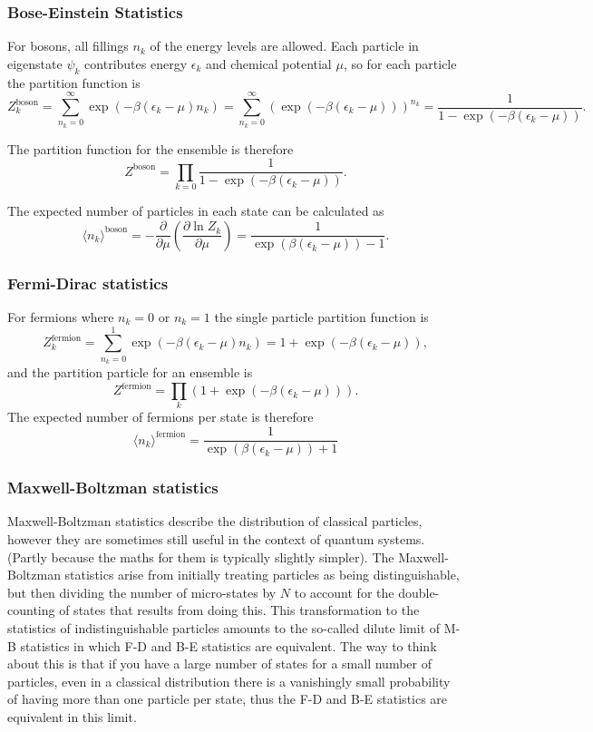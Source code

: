 \subsubsection{Bose-Einstein Statistics}
For bosons, all fillings $n_k$ of the energy levels are allowed. Each particle in eigenstate $\psi_k$ contributes energy $\epsilon_k$ and chemical potential $\mu$, so for each particle the partition function is
$$
	Z_k^\text{boson} = \sum_{n_k=0}^\infty\exp(-\beta(\epsilon_k-\mu)n_k) = \sum_{n_k=0}^\infty\left(\exp(-\beta(\epsilon_k-\mu))\right)^{n_k} = \frac{1}{1-\exp(-\beta(\epsilon_k-\mu))}.
$$

The partition function for the ensemble is therefore
$$
	Z^\text{boson} = \prod_{k=0} \frac{1}{1-\exp(-\beta(\epsilon_k-\mu))}.
$$

The expected number of particles in each state can be calculated as
$$
	\langle n_k \rangle^\text{boson} = -\frac{\partial}{\partial \mu}\left(\frac{\partial \ln Z_{k}}{\partial \mu}\right)= \frac{1}{\exp(\beta(\epsilon_k-\mu))-1}.
$$

\subsubsection{Fermi-Dirac statistics}
For fermions where $n_k=0$ or $n_k=1$ the single particle partition function is
$$
	Z_k^\text{fermion} = \sum_{n_k=0}^1 \exp(-\beta(\epsilon_k-\mu)n_k) = 1 + \exp(-\beta(\epsilon_k-\mu)),
$$
and the partition particle for an ensemble is
$$
	Z^\text{fermion} = \prod_k(1+ \exp(-\beta(\epsilon_k-\mu))).
$$
The expected number of fermions per state is therefore
$$
		\langle n_k \rangle^\text{fermion} = \frac{1}{\exp(\beta(\epsilon_k-\mu))+1}
$$

\subsubsection{Maxwell-Boltzman statistics}
Maxwell-Boltzman statistics describe the distribution of classical particles, however they are sometimes still useful in the context of quantum systems. (Partly because the maths for them is typically slightly simpler). The Maxwell-Boltzman statistics arise from initially treating particles as being distinguishable, but then dividing the number of micro-states by $N\!$ to account for the double-counting of states that results from doing this. This transformation to the statistics of indistinguishable particles amounts to the so-called dilute limit of M-B statistics in which F-D and B-E statistics are equivalent. The way to think about this is that if you have a large number of states for a small number of particles, even in a classical distribution there is a vanishingly small probability of having more than one particle per state, thus the F-D and B-E statistics are equivalent in this limit.

